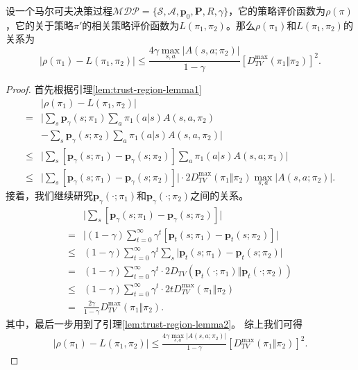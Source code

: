 \begin{theorem}
    设一个马尔可夫决策过程$\mathcal{MDP} = \{\mathcal{S}, \mathcal{A}, \mathbf{p}_0, \mathbf{P}, R, \gamma\}$，它的策略评价函数为$\rho(\pi)$，它的关于策略$\pi'$的相关策略评价函数为$L(\pi_1, \pi_2)$。那么$\rho(\pi_1)$和$L(\pi_1, \pi_2)$的关系为
    \begin{equation}
        \vert \rho(\pi_1) - L(\pi_1, \pi_2) \vert \le \frac{4 \gamma \max_{s, a} \vert A(s,a; \pi_2) \vert}{1 - \gamma} 
            [D^{\max}_{TV} (\pi_1 \Vert \pi_2)]^2.
    \end{equation}
\end{theorem}
\begin{proof}
    首先根据引理\ref{lem:trust-region-lemma1}
    \begin{align*}
    & \vert \rho(\pi_1) - L(\pi_1, \pi_2) \vert \\
    =& \bigg\vert \sum_{s} \mathbf{p}_{\gamma}(s; \pi_1) \sum_a \pi_1(a \vert s) A(s, a, \pi_2) \\
    &- \sum_{s} \mathbf{p}_{\gamma}(s; \pi_2) \sum_a \pi_1(a \vert s) A(s, a, \pi_2) \bigg\vert \\
    \le& \bigg\vert \sum_{s} [\mathbf{p}_{\gamma}(s; \pi_1) - \mathbf{p}_{\gamma}(s; \pi_2)] \sum_a \pi_1(a \vert s) A(s, a; \pi_1)\bigg\vert \\
    \le& \bigg\vert \sum_{s} [\mathbf{p}_{\gamma}(s; \pi_1) - \mathbf{p}_{\gamma}(s; \pi_2)] \bigg\vert
    \cdot 2 D^{\max}_{TV}(\pi_1 \Vert \pi_2) \max_{s, a} \vert A(s, a; \pi_2) \vert.
    \end{align*} 
    接着，我们继续研究$\mathbf{p}_\gamma(\cdot; \pi_1)$和$\mathbf{p}_\gamma(\cdot;\pi_2)$之间的关系。
    \begin{align*}
        &\bigg\vert \sum_{s} [\mathbf{p}_{\gamma}(s; \pi_1) - \mathbf{p}_{\gamma}(s; \pi_2)] \bigg\vert \\
        =& \bigg\vert (1 - \gamma) \sum^{\infty}_{t = 0} \gamma^t [\mathbf{p}_t(s; \pi_1) - \mathbf{p}_t(s; \pi_2)] \bigg\vert\\
        \le& (1 - \gamma) \sum^{\infty}_{t=0} \gamma^t \sum_{s} \vert \mathbf{p}_t(s; \pi_1) - \mathbf{p}_t(s; \pi_2) \vert \\
        =& (1 - \gamma) \sum^{\infty}_{t=0} \gamma^t \cdot 2 D_{TV}(\mathbf{p}_t(\cdot; \pi_1) \Vert \mathbf{p}_t(\cdot; \pi_2))\\
        \le& (1 - \gamma) \sum^{\infty}_{t=0} \gamma^t \cdot 2 t D^{\max}_{TV}(\pi_1 \Vert \pi_2)\\
        =& \frac{2\gamma}{1 - \gamma} D^{\max}_{TV}(\pi_1 \Vert \pi_2).
    \end{align*}
    其中，最后一步用到了引理\ref{lem:trust-region-lemma2}。
    综上我们可得
    \begin{align*}
        \vert \rho(\pi_1) - L(\pi_1, \pi_2) \vert \le \frac{4 \gamma \max_{s, a} \vert A(s,a; \pi_2) \vert}{1 - \gamma} 
            [D^{\max}_{TV} (\pi_1 \Vert \pi_2)]^2.
    \end{align*}
\end{proof}

